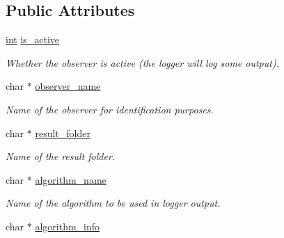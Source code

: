 \subsection*{Public Attributes}
\begin{DoxyCompactItemize}
\item 
\hyperlink{classint}{int} \hyperlink{structcoco__observer__s_ae9302ff3b1451269f12f518274b6518a}{is\+\_\+active}\hypertarget{structcoco__observer__s_ae9302ff3b1451269f12f518274b6518a}{}\label{structcoco__observer__s_ae9302ff3b1451269f12f518274b6518a}

\begin{DoxyCompactList}\small\item\em Whether the observer is active (the logger will log some output). \end{DoxyCompactList}\item 
char $\ast$ \hyperlink{structcoco__observer__s_ad81d41d5dffd35827bfe4a25be10f828}{observer\+\_\+name}\hypertarget{structcoco__observer__s_ad81d41d5dffd35827bfe4a25be10f828}{}\label{structcoco__observer__s_ad81d41d5dffd35827bfe4a25be10f828}

\begin{DoxyCompactList}\small\item\em Name of the observer for identification purposes. \end{DoxyCompactList}\item 
char $\ast$ \hyperlink{structcoco__observer__s_a1f8e69cf33b686f440d43adf0e5b662e}{result\+\_\+folder}\hypertarget{structcoco__observer__s_a1f8e69cf33b686f440d43adf0e5b662e}{}\label{structcoco__observer__s_a1f8e69cf33b686f440d43adf0e5b662e}

\begin{DoxyCompactList}\small\item\em Name of the result folder. \end{DoxyCompactList}\item 
char $\ast$ \hyperlink{structcoco__observer__s_a6edf2748c41a680d2daf80912797f4f6}{algorithm\+\_\+name}\hypertarget{structcoco__observer__s_a6edf2748c41a680d2daf80912797f4f6}{}\label{structcoco__observer__s_a6edf2748c41a680d2daf80912797f4f6}

\begin{DoxyCompactList}\small\item\em Name of the algorithm to be used in logger output. \end{DoxyCompactList}\item 
char $\ast$ \hyperlink{structcoco__observer__s_a5e358745502f90247c05f0768fc6232d}{algorithm\+\_\+info}\hypertarget{structcoco__observer__s_a5e358745502f90247c05f0768fc6232d}{}\label{structcoco__observer__s_a5e358745502f90247c05f0768fc6232d}


\end{DoxyCompactItemize}
